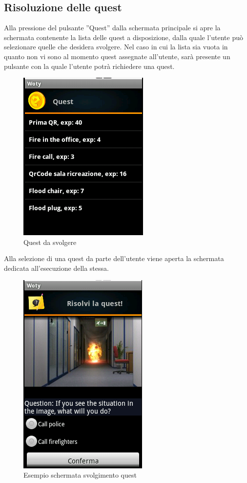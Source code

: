 \subsection{Risoluzione delle quest}

Alla pressione del pulsante ''Quest'' dalla schermata principale si apre la schermata contenente la lista delle quest a disposizione, dalla quale l'utente può selezionare quelle che desidera svolgere. Nel caso in cui la lista sia vuota in quanto non vi sono al momento quest assegnate all'utente, sarà presente un pulsante con la quale l'utente potrà richiedere una quest.

\begin{center}
\begin{figure}[H]
\centering
\includegraphics[scale=0.55]{images/pendinquests.png}
\caption{ Quest da svolgere }
\end{figure}
\end{center}

Alla selezione di una quest da parte dell'utente viene aperta la schermata dedicata all'esecuzione della stessa.

\begin{center}
\begin{figure}[H]
\centering
\includegraphics[scale=0.55]{images/solvequest.png}
\caption{ Esempio schermata svolgimento quest }
\end{figure}
\end{center}

